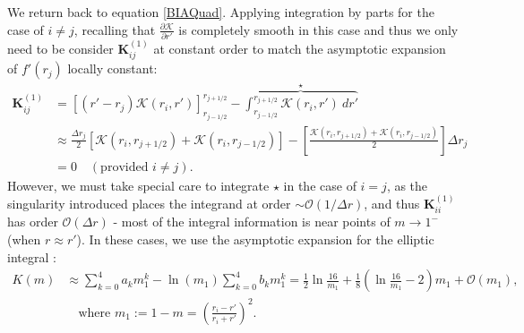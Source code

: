 \documentclass[11pt,a4paper]{article}
\begin{document}
	We return back to equation \eqref{BIAQuad}. Applying integration by parts for the case of $i \neq j$, recalling that $\frac{\partial \mathcal{K}}{\partial r'}$ is completely smooth in this case and thus we only need to be consider $\mathbf{K}^{(1)}_{ij}$ at constant order to match the asymptotic expansion of $f'(r_j)$ locally constant:
	\begin{equation}
		\label{BIANonSingular}
		\begin{aligned}
			\mathbf{K}^{(1)}_{ij} &= \left[(r' - r_j)\mathcal{K}(r_i,r')\right]^{r_{j+1/2}}_{r_{j-1/2}} - \overbrace{\int^{r_{j+1/2}}_{r_{j-1/2}} \mathcal{K}(r_i,r')\ dr'}^\star \\
			&\approx \frac{\Delta r_j}{2}\left[\mathcal{K}(r_i,r_{j+1/2}) + \mathcal{K}(r_i,r_{j-1/2})\right] - \left[ \frac{\mathcal{K}(r_i,r_{j+1/2}) + \mathcal{K}(r_i,r_{j-1/2})}{2} \right]\Delta r_j \\
			&= 0 \quad (\text{provided } i \neq j).
		\end{aligned}
	\end{equation}
	However, we must take special care to integrate $\star$ in the case of $i = j$, as the singularity introduced places the integrand at order $\sim \mathcal{O}(1 / \Delta r)$, and thus $\mathbf{K}^{(1)}_{ii}$ has order $\mathcal{O}(\Delta r)$ - most of the integral information is near points of $m \to 1^-$ (when $r \approx r'$).
	In these cases, we use the asymptotic expansion for the elliptic integral :
	\begin{equation}
		\begin{aligned}
			K(m) &\approx \sum_{k=0}^4 a_k m_1^k - \ln(m_1)\sum_{k=0}^4 b_k m_1^k = \frac{1}{2}\ln\frac{16}{m_1} +  \frac{1}{8}\left(\ln\frac{16}{m_1} - 2\right)m_1 + \mathcal{O}(m_1),\\
			&\quad \text{where } m_1 := 1 - m = \left(\frac{r_i-r'}{r_i+r'}\right)^2.
		\end{aligned}
	\end{equation}
\end{document}
